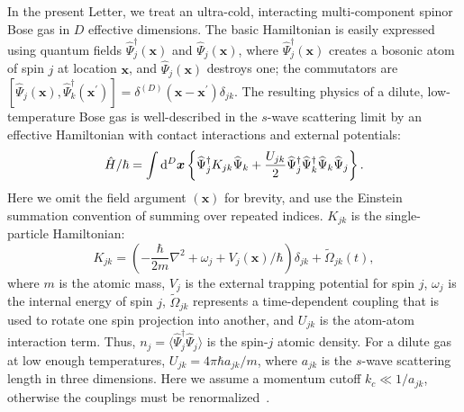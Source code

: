 \documentclass[doublecol]{epl2}
\newcommand{\xvec}{\boldsymbol{x}}
\begin{document}
In the present Letter, we treat an ultra-cold,
interacting multi-component spinor Bose gas in $D$ effective dimensions.
The basic Hamiltonian is easily expressed using quantum fields
$\widehat{\Psi}_j^{\dagger}(\xvec)$ and $\widehat{\Psi}_j(\xvec)$,
where $\widehat{\Psi}_j^{\dagger}(\xvec)$ creates a bosonic atom of spin $j$
at location $\xvec$, and $\widehat{\Psi}_j(\xvec)$ destroys one;
the commutators are
$[\widehat{\Psi}_j(\xvec),\widehat{\Psi}_k^{\dagger}(\xvec^\prime)] =
\delta^{(D)}(\xvec-\xvec^\prime)\delta_{jk}.$
The resulting physics of a dilute, low-temperature Bose gas
is well-described in the $s$-wave scattering limit by an effective Hamiltonian
with contact interactions and external potentials:
\begin{equation}
	\hat{H} / \hbar = \int \upd^{D}\xvec \left\{
		\widehat{\Psi}_j^{\dagger} K_{jk} \widehat{\Psi}_k +
		\frac{U_{jk}}{2} \widehat{\Psi}_j^{\dagger} \widehat{\Psi}_k^{\dagger}
		\widehat{\Psi}_k \widehat{\Psi}_j
	\right\}.
\end{equation}
Here we omit the field argument $(\xvec)$ for brevity,
and use the Einstein summation convention of summing over repeated indices.
$K_{jk}$ is the single-particle Hamiltonian:
\begin{equation}
	K_{jk} = \left( -\frac{\hbar}{2m} \nabla^2 + \omega_j + V_j(\xvec) / \hbar \right) \delta_{jk} +
		\tilde{\Omega}_{jk}(t),
\end{equation}
where $m$ is the atomic mass, $V_j$ is the external trapping potential for spin $j$,
$\omega_j$ is the internal energy of spin $j$,
$\tilde{\Omega}_{jk}$ represents a time-dependent coupling
that is used to rotate one spin projection into another,
and $U_{jk}$ is the atom-atom interaction term.
Thus, $n_j = \langle \widehat{\Psi}_j^{\dagger} \widehat{\Psi}_j \rangle$
is the spin-$j$ atomic density.
For a dilute gas at low enough temperatures,
$U_{jk}=4\pi\hbar a_{jk} / m$, where $a_{jk}$ is the $s$-wave scattering length in three dimensions.
Here we assume a momentum cutoff $k_{c} \ll 1 / a_{jk}$,
otherwise the couplings must be renormalized~\cite{Sinatra2002}.
\end{document}
